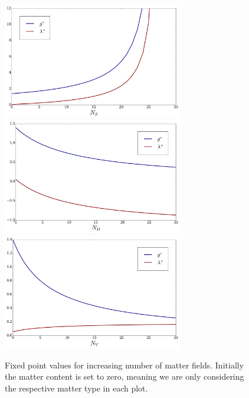  \begin{figure}[t]
 	\centering
 	\vfill
 	\includegraphics[width=0.7\textwidth]{figs/Plots/FP_scalars}
 	\vfill
 	\includegraphics[width=0.7\textwidth]{figs/Plots/FP_fermions}
 	\vfill
 	\includegraphics[width=0.7\textwidth]{figs/Plots/FP_gauge}
 	\vfill
 	\caption{Fixed point values for increasing number of matter fields. Initially the matter content is set to zero, meaning we are only considering the respective matter type in each plot.}
 	\label{fig:matter_plots}
 \end{figure}